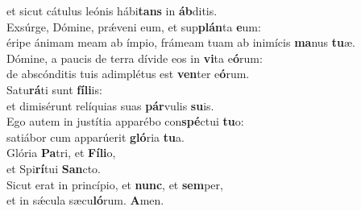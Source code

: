 \oddverse et sicut cátulus leónis hábi\textbf{tans} in \textbf{áb}ditis.\\
\evenverse Exsúrge, Dómine, prǽveni eum, et sup\textbf{plán}ta \textbf{e}um:~\*\\
\evenverse éripe ánimam meam ab ímpio, frámeam tuam ab inimícis \textbf{ma}nus \textbf{tu}æ.\\
\oddverse Dómine, a paucis de terra dívide eos in \textbf{vi}ta e\textbf{ó}rum:~\*\\
\oddverse de abscónditis tuis adimplétus est \textbf{ven}ter e\textbf{ó}rum.\\
\evenverse Satu\textbf{rá}ti sunt \textbf{fí}\textbf{li}is:~\*\\
\evenverse et dimisérunt relíquias suas \textbf{pár}vulis \textbf{su}is.\\
\oddverse Ego autem in justítia apparébo con\textbf{spé}ctui \textbf{tu}o:~\*\\
\oddverse satiábor cum apparúerit \textbf{gló}ria \textbf{tu}a.\\
\evenverse Glória \textbf{Pa}tri, et \textbf{Fí}\textbf{li}o,~\*\\
\evenverse et Spi\textbf{rí}tui \textbf{San}cto.\\
\oddverse Sicut erat in princípio, et \textbf{nunc}, et \textbf{sem}per,~\*\\
\oddverse et in sǽcula sæcu\textbf{ló}rum. \textbf{A}men.\\
